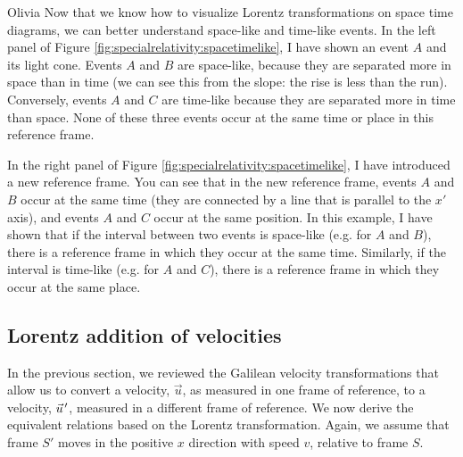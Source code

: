 \begin{studentOpinion}{Olivia}
Now that we know how to visualize Lorentz transformations on space time diagrams, we can better understand space-like and time-like events. In the left panel of Figure \ref{fig:specialrelativity:spacetimelike}, I have shown an event $A$ and its light cone. Events $A$ and $B$ are space-like, because they are separated more in space than in time (we can see this from the slope: the rise is less than the run). Conversely, events $A$ and $C$ are time-like because they are separated more in time than space. None of these three events occur at the same time or place in this reference frame.


In the right panel of Figure \ref{fig:specialrelativity:spacetimelike}, I have introduced a new reference frame. You can see that in the new reference frame, events $A$ and $B$ occur at the same time (they are connected by a line that is parallel to the $x'$ axis), and events $A$ and $C$ occur at the same position. In this example, I have shown that if the interval between two events is space-like (e.g. for $A$ and $B$), there is a reference frame in which they occur at the same time. Similarly, if the interval is time-like (e.g. for $A$ and $C$), there is a reference frame in which they occur at the same place. 
\end{studentOpinion}


\subsection{Lorentz addition of velocities}
In the previous section, we reviewed the Galilean velocity transformations that allow us to convert a velocity, $\vec u$, as measured in one frame of reference, to a velocity, $\pvec u'$, measured in a different frame of reference. We now derive the equivalent relations based on the Lorentz transformation. Again, we assume that frame $S'$ moves in the positive $x$ direction with speed $v$, relative to frame $S$. 

